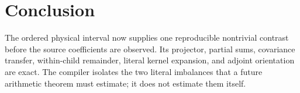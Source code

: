 \documentclass[10pt]{article}
\begin{document}
\section{Conclusion}

The ordered physical interval now supplies one reproducible nontrivial
contrast before the source coefficients are observed.  Its projector,
partial sums, covariance transfer, within-child remainder, literal kernel
expansion, and adjoint orientation are exact.  The compiler isolates the two
literal imbalances that a future arithmetic theorem must estimate; it does
not estimate them itself.



\end{document}

